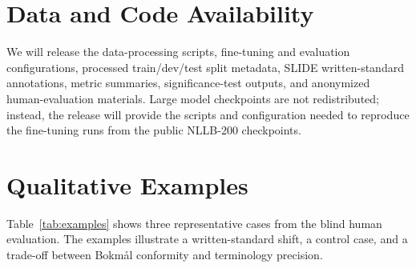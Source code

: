 \documentclass[11pt]{article}
\newcommand{\nb}{Bokm{\aa}l}
\begin{document}
\section*{Data and Code Availability}

We will release the data-processing scripts, fine-tuning and evaluation configurations, processed train/dev/test split metadata, SLIDE written-standard annotations, metric summaries, significance-test outputs, and anonymized human-evaluation materials. Large model checkpoints are not redistributed; instead, the release will provide the scripts and configuration needed to reproduce the fine-tuning runs from the public NLLB-200 checkpoints.




\appendix

\section{Qualitative Examples}
\label{app:qualitative-examples}

Table~\ref{tab:examples} shows three representative cases from the blind human evaluation. The examples illustrate a written-standard shift, a control case, and a trade-off between \nb{} conformity and terminology precision.
\end{document}
